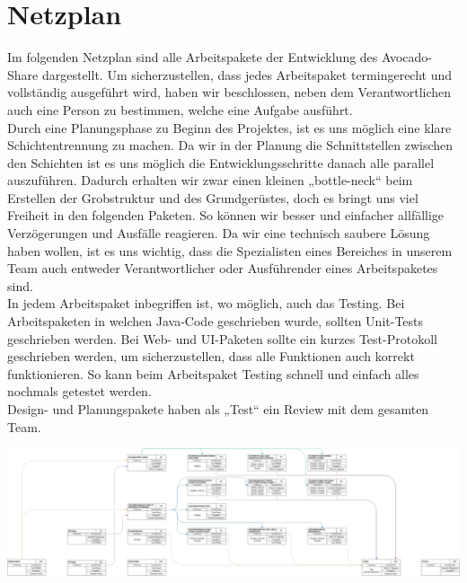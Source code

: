 \section{Netzplan}
Im folgenden Netzplan sind alle Arbeitspakete der Entwicklung des Avocado-Share dargestellt. 
Um sicherzustellen, dass jedes Arbeitspaket termingerecht und vollständig ausgeführt wird, haben wir beschlossen, neben dem Verantwortlichen auch eine Person zu bestimmen, welche eine Aufgabe ausführt.\\

Durch eine Planungsphase zu Beginn des Projektes, ist es uns möglich eine klare Schichtentrennung zu machen.
Da wir in der Planung die Schnittstellen zwischen den Schichten ist es uns möglich die Entwicklungsschritte danach
alle parallel auszuführen. Dadurch erhalten wir zwar einen kleinen „bottle-neck“ beim Erstellen der Grobstruktur und des
Grundgerüstes, doch es bringt uns viel Freiheit in den folgenden Paketen. So können wir besser und einfacher allfällige
Verzögerungen und Ausfälle reagieren.
Da wir eine technisch saubere Lösung haben wollen, ist es uns wichtig, dass die Spezialisten eines Bereiches in unserem Team auch entweder Verantwortlicher oder Ausführender eines Arbeitspaketes sind. \\

In jedem Arbeitspaket inbegriffen ist, wo möglich, auch das Testing.
Bei Arbeitspaketen in welchen Java-Code geschrieben wurde, sollten Unit-Tests geschrieben werden.
Bei Web- und UI-Paketen sollte ein kurzes Test-Protokoll geschrieben werden, um sicherzustellen, dass alle Funktionen auch korrekt funktionieren.
So kann beim Arbeitspaket Testing schnell und einfach alles nochmals getestet werden.\\

Design- und Planungspakete haben als „Test“ ein Review mit dem gesamten Team.

\begin{landscape}
\vspace*{\fill}
\includegraphics[width=\linewidth-1cm]{graphics/netzplan.jpg}
\vspace*{\fill}
\end{landscape}